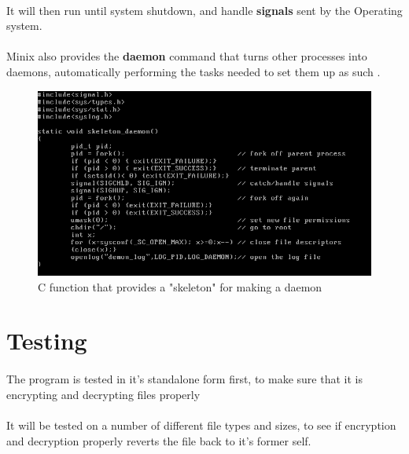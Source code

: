\documentclass{article}
\begin{document}
        \paragraph{}It will then run until system shutdown, and handle \textbf{signals} sent by the Operating system.
        \paragraph{}Minix also provides the \textbf{daemon} command that turns other processes into daemons, automatically performing the tasks needed to set them up as such \parencite{daemon_command_minix}.

        \begin{figure}[htbp]
            \centering
            \includegraphics[width=\textwidth]{daemon_code_screenshot_1.png}
            \caption{C function that provides a "skeleton" for making a daemon}
            \label{fig:my_label}
        \end{figure}
    

\section{Testing}
    \paragraph{}The program is tested in it's standalone form first, to make sure that it is encrypting and decrypting files properly
    \paragraph{}It will be tested on a number of different file types and sizes, to see if encryption and decryption properly reverts the file back to it's former self.
\end{document}
